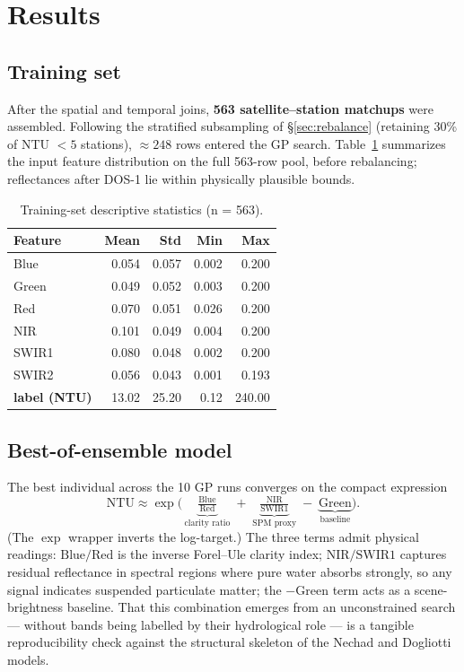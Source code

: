\documentclass[11pt,a4paper]{article}
\begin{document}
\section{Results}
\label{sec:results}

\subsection{Training set}
After the spatial and temporal joins, \textbf{563 satellite--station matchups} were assembled. Following the stratified subsampling of \S\ref{sec:rebalance} (retaining 30\% of NTU $<5$ stations), $\approx 248$ rows entered the GP search. Table~\ref{tab:bandstats} summarizes the input feature distribution on the full 563-row pool, before rebalancing; reflectances after DOS-1 lie within physically plausible bounds.

\begin{table}[h]
\centering
\caption{Training-set descriptive statistics (n = 563).}
\label{tab:bandstats}
\small
\begin{tabular}{lrrrr}
\toprule
Feature & Mean & Std & Min & Max \\
\midrule
Blue   & 0.054 & 0.057 & 0.002 & 0.200 \\
Green  & 0.049 & 0.052 & 0.003 & 0.200 \\
Red    & 0.070 & 0.051 & 0.026 & 0.200 \\
NIR    & 0.101 & 0.049 & 0.004 & 0.200 \\
SWIR1  & 0.080 & 0.048 & 0.002 & 0.200 \\
SWIR2  & 0.056 & 0.043 & 0.001 & 0.193 \\
\midrule
\textbf{label (NTU)} & 13.02 & 25.20 & 0.12 & 240.00 \\
\bottomrule
\end{tabular}
\end{table}

\subsection{Best-of-ensemble model}
The best individual across the 10 GP runs converges on the compact expression
\begin{equation}
    \mathrm{NTU} \approx \exp\!\Big(\,\underbrace{\tfrac{\mathrm{Blue}}{\mathrm{Red}}}_{\text{clarity ratio}} \;+\; \underbrace{\tfrac{\mathrm{NIR}}{\mathrm{SWIR1}}}_{\text{SPM proxy}} \;-\; \underbrace{\mathrm{Green}}_{\text{baseline}} \Big).
    \label{eq:bestmodel}
\end{equation}
(The $\exp$ wrapper inverts the log-target.) The three terms admit physical readings: $\text{Blue}/\text{Red}$ is the inverse Forel--Ule clarity index; $\text{NIR}/\text{SWIR1}$ captures residual reflectance in spectral regions where pure water absorbs strongly, so any signal indicates suspended particulate matter; the $-\mathrm{Green}$ term acts as a scene-brightness baseline. That this combination emerges from an unconstrained search --- without bands being labelled by their hydrological role --- is a tangible reproducibility check against the structural skeleton of the Nechad and Dogliotti models.
\end{document}
